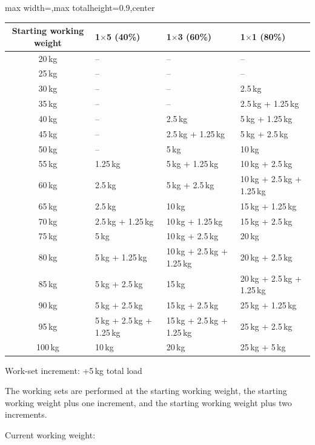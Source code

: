 \documentclass[11pt,a4paper]{article}
\newcommand{\tablearraystretch}{1.15}
\begin{document}
\begin{center}
\renewcommand{\arraystretch}{\tablearraystretch}
\begin{adjustbox}{max width=\linewidth,max totalheight=0.9\textheight,center}
\begin{tabular}{c p{4cm} p{4cm} p{4cm}}
\toprule
Starting working weight &
1$\times$5 (40\%) &
1$\times$3 (60\%) &
1$\times$1 (80\%) \\
\midrule
20\,kg   & -- & -- & -- \\
25\,kg   & -- & -- & -- \\
30\,kg   & -- & -- & 2.5\,kg \\
35\,kg   & -- & -- & 2.5\,kg + 1.25\,kg \\
40\,kg   & -- & 2.5\,kg & 5\,kg + 1.25\,kg \\
45\,kg   & -- & 2.5\,kg + 1.25\,kg & 5\,kg + 2.5\,kg \\
50\,kg   & -- & 5\,kg & 10\,kg \\
55\,kg   & 1.25\,kg & 5\,kg + 1.25\,kg & 10\,kg + 2.5\,kg \\
60\,kg   & 2.5\,kg & 5\,kg + 2.5\,kg & 10\,kg + 2.5\,kg + 1.25\,kg \\
65\,kg   & 2.5\,kg & 10\,kg & 15\,kg + 1.25\,kg \\
70\,kg   & 2.5\,kg + 1.25\,kg & 10\,kg + 1.25\,kg & 15\,kg + 2.5\,kg \\
75\,kg   & 5\,kg & 10\,kg + 2.5\,kg & 20\,kg \\
80\,kg   & 5\,kg + 1.25\,kg & 10\,kg + 2.5\,kg + 1.25\,kg & 20\,kg + 2.5\,kg \\
85\,kg   & 5\,kg + 2.5\,kg & 15\,kg & 20\,kg + 2.5\,kg + 1.25\,kg \\
90\,kg   & 5\,kg + 2.5\,kg & 15\,kg + 2.5\,kg & 25\,kg + 1.25\,kg \\
95\,kg   & 5\,kg + 2.5\,kg + 1.25\,kg & 15\,kg + 2.5\,kg + 1.25\,kg & 25\,kg + 2.5\,kg \\
100\,kg  & 10\,kg & 20\,kg & 25\,kg + 5\,kg \\
\bottomrule
\end{tabular}
\end{adjustbox}
\renewcommand{\arraystretch}{1}
\end{center}

Work-set increment: +5\,kg total load

The working sets are performed at the starting working weight, the starting working weight plus one increment, and the starting working weight plus two increments.

Current working weight:
\end{document}
